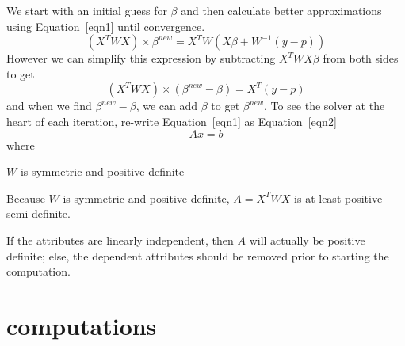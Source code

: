 \documentclass[12pt,timesnewroman,letterpaper]{article}
\begin{document}
We start with an initial guess for \(\beta\) and then calculate better
approximations using Equation~\ref{eqn1} until convergence.
\begin{equation}
\label{eqn1}
(X^T W X) \times \beta ^{new} = X^T W ( X \beta + W^{-1}(y - p) )
\end{equation}
However we can simplify this expression by subtracting $X^TWX\beta$ from both
sides to get
\begin{equation}
\label{eqn2}
(X^T W X) \times (\beta ^{new} - \beta) = X^T(y - p)
\end{equation}
and when we find $\beta^{new} - \beta$, we can add $\beta$ to get $\beta^{new}$.
To see the solver at the heart of each iteration, re-write Equation~\ref{eqn1} as Equation~\ref{eqn2}
\begin{equation}
\label{eqn3}
A x = b
\end{equation}
where 
\be
\item \(W\) is symmetric and positive definite
\item Because \(W\) is symmetric and positive definite, \(A = 
  X^T W X\) is at least positive semi-definite.
\item If the attributes are linearly independent, then \(A\) will actually be
  positive definite; else, the dependent attributes should be removed prior to
  starting the computation.


\ee

\section{computations}
\end{document}
